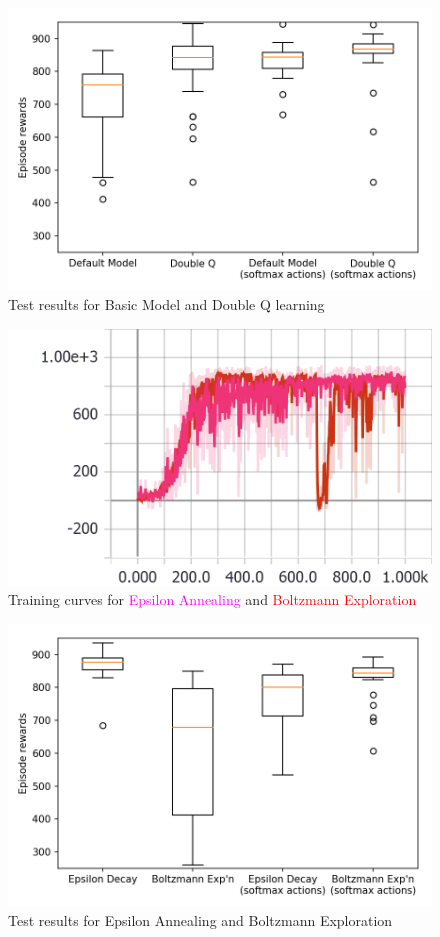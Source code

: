 \documentclass[a4paper, 11pt, conference]{ieeeconf}      %
\begin{document}
\begin{figure}
  \includegraphics[width=\linewidth]{figs/racecar_1.png}
  \caption{Test results for Basic Model and Double Q learning}
  \label{fig:test1}
\end{figure}

\begin{figure}
  \includegraphics[width=\linewidth]{figs/racecar_train_2.png}
  \caption{Training curves for \textcolor{magenta}{Epsilon Annealing} and \textcolor{red}{Boltzmann Exploration}}
  \label{fig:train2}
\end{figure}

\begin{figure}
  \includegraphics[width=\linewidth]{figs/racecar_2.png}
  \caption{Test results for Epsilon Annealing and Boltzmann Exploration}
  \label{fig:test2}
\end{figure}
\end{document}
